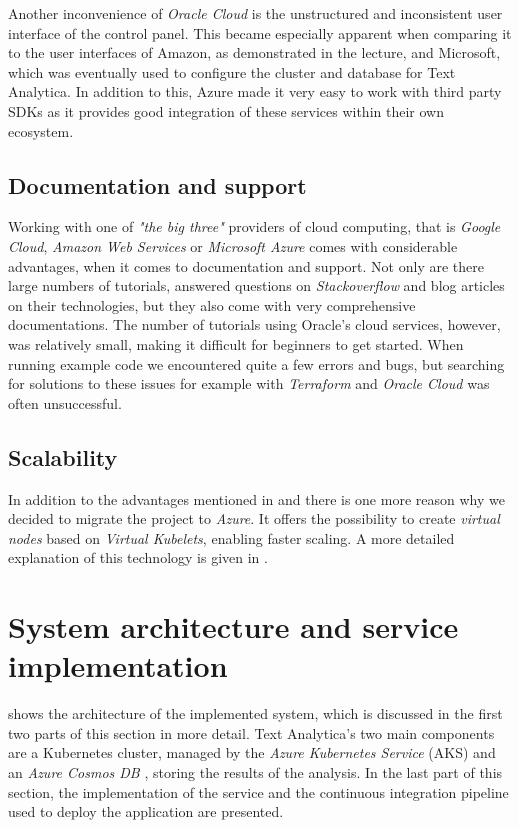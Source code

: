 \documentclass[conference]{IEEEtran}
\begin{document}
Another inconvenience of \textit{Oracle Cloud} is the unstructured and inconsistent user interface of the control panel. This became especially apparent when comparing it to the user interfaces of Amazon, as demonstrated in the lecture, and Microsoft, which was eventually used to configure the cluster and database for Text Analytica. In addition to this, Azure made it very easy to work with third party SDKs as it provides good integration of these services within their own ecosystem.

\subsection{Documentation and support}
\label{subsec:docandsupport}
Working with one of \textit{"the big three"} providers of cloud computing, that is \textit{Google Cloud}, \textit{Amazon Web Services} or \textit{Microsoft Azure} comes with considerable advantages, when it comes to documentation and support. Not only are there large numbers of tutorials, answered questions on \textit{Stackoverflow} and blog articles on their technologies, but they also come with very comprehensive documentations. The number of tutorials using Oracle's cloud services, however, was relatively small, making it difficult for beginners to get started. When running example code we encountered quite a few errors and bugs, but searching for solutions to these issues for example with \textit{Terraform} and \textit{Oracle Cloud} was often unsuccessful.

\subsection{Scalability}
In addition to the advantages mentioned in  and  there is one more reason why we decided to migrate the project to \textit{Azure}. It offers the possibility to create \textit{virtual nodes} based on \textit{Virtual Kubelets}\cite{VirtualKubelet}, enabling faster scaling. A more detailed explanation of this technology is given in .

\section{System architecture and service implementation}
\label{sec:system-architecture}
 shows the architecture of the implemented system, which is discussed in the first two parts of this section in more detail. Text Analytica's two main components are a Kubernetes cluster, managed by the \textit{Azure Kubernetes Service} (AKS) \cite{AKS} and an \textit{Azure Cosmos DB} \cite{CosmosDB}, storing the results of the analysis. In the last part of this section, the implementation of the service and the continuous integration pipeline used to deploy the application are presented.
\end{document}
